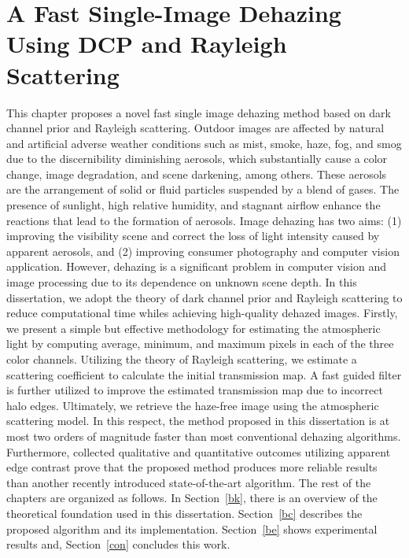 \documentclass[doctor,english,listoffigures,listoftables]{thesis-uestc}
\begin{document}
\chapter{A Fast Single-Image Dehazing Using DCP and Rayleigh Scattering}\label{Chapter:Ch3}
This chapter proposes a novel fast single image dehazing method based on dark channel prior and Rayleigh scattering. Outdoor images are affected by natural and artificial adverse weather conditions such as mist, smoke, haze, fog, and smog due to the discernibility diminishing aerosols, which substantially cause a color change, image degradation, and scene darkening, among others. These aerosols are the arrangement of solid or fluid particles suspended by a blend of gases. The presence of sunlight, high relative humidity, and stagnant airflow enhance the reactions that lead to the formation of aerosols. Image dehazing has two aims: (1) improving the visibility scene and correct the loss of light intensity caused by apparent aerosols, and (2) improving consumer photography and computer vision application. However, dehazing is a significant problem in computer vision and image processing due to its dependence on unknown scene depth. 
In this dissertation, we adopt the theory of dark channel prior and Rayleigh scattering to reduce computational time whiles achieving high-quality dehazed images. Firstly, we present a simple but effective methodology for estimating the atmospheric light by computing average, minimum, and maximum pixels in each of the three color channels. Utilizing the theory of Rayleigh scattering, we estimate a scattering coefficient to calculate the initial transmission map. A fast guided filter is further utilized to improve the estimated transmission map due to incorrect halo edges. Ultimately, we retrieve the haze-free image using the atmospheric scattering model. In this respect, the method proposed in this dissertation is at most two orders of magnitude faster than most conventional dehazing algorithms. Furthermore, collected qualitative and quantitative outcomes utilizing apparent edge contrast prove that the proposed method produces more reliable results than another recently introduced state-of-the-art algorithm. The rest of the chapters are organized as follows. In Section~\ref{bk}, there is an overview of the theoretical foundation used in this dissertation. Section~\ref{bc} describes the proposed algorithm and its implementation. Section~\ref{be} shows experimental results and, Section~\ref{con} concludes this work.
\end{document}
